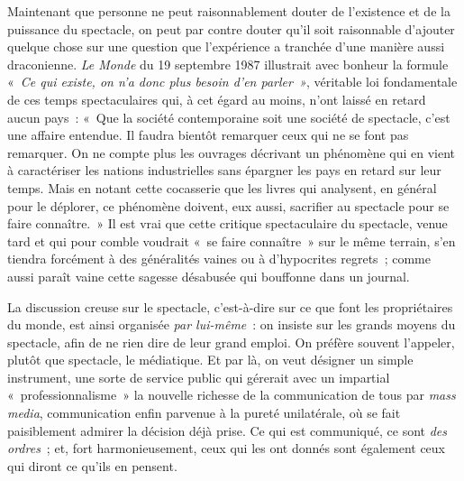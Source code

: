 \documentclass[french,twoside]{book} %
\begin{document}
\noindent Maintenant que personne ne peut raisonnablement douter de l’existence et de la puissance du spectacle, on peut par contre douter qu’il soit raisonnable d’ajouter quelque chose sur une question que l’expérience a tranchée d’une manière aussi draconienne. \emph{Le Monde} du 19 septembre 1987 illustrait avec bonheur la formule « \emph{Ce qui existe, on n’a donc plus besoin d’en parler »}, véritable loi fondamentale de ces temps spectaculaires qui, à cet égard au moins, n’ont laissé en retard aucun pays : « Que la société contemporaine soit une société de spectacle, c’est une affaire entendue. Il faudra bientôt remarquer ceux qui ne se font pas remarquer. On ne compte plus les ouvrages décrivant un phénomène qui en vient à caractériser les nations industrielles sans épargner les pays en retard sur leur temps. Mais en notant cette cocasserie que les livres qui analysent, en général pour le déplorer, ce phénomène doivent, eux aussi, sacrifier au spectacle pour se faire connaître. » Il est vrai que cette critique spectaculaire du spectacle, venue tard et qui pour comble voudrait « se faire connaître » sur le même terrain, s’en tiendra forcément à des généralités vaines ou à d’hypocrites regrets ; comme aussi paraît vaine cette sagesse désabusée qui bouffonne dans un journal.\par
La discussion creuse sur le spectacle, c’est-à-dire sur ce que font les propriétaires du monde, est ainsi organisée \emph{par lui-même} : on insiste sur les grands moyens du spectacle, afin de ne rien dire de leur grand emploi. On préfère souvent l’appeler, plutôt que spectacle, le médiatique. Et par là, on veut désigner un simple instrument, une sorte de service public qui gérerait avec un impartial « professionnalisme » la nouvelle richesse de la communication de tous par \emph{mass media}, communication enfin parvenue à la pureté unilatérale, où se fait paisiblement admirer la décision déjà prise. Ce qui est communiqué, ce sont \emph{des ordres} ; et, fort harmonieusement, ceux qui les ont donnés sont également ceux qui diront ce qu’ils en pensent.\par
\end{document}
